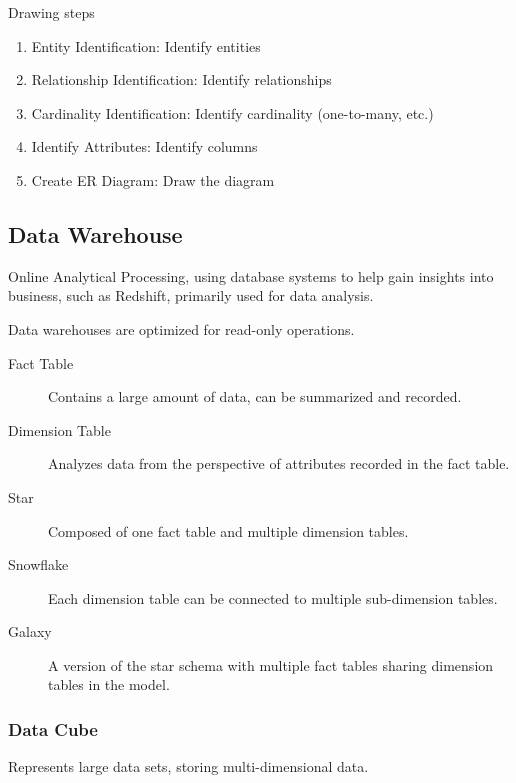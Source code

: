 \documentclass[11pt,journal,compsoc]{IEEEtran}
\begin{document}
Drawing steps

\begin{enumerate}
    \item Entity Identification: Identify entities
    \item Relationship Identification: Identify relationships
    \item Cardinality Identification: Identify cardinality (one-to-many, etc.)
    \item Identify Attributes: Identify columns
    \item Create ER Diagram: Draw the diagram
\end{enumerate}


\subsection{Data Warehouse}

Online Analytical Processing, using database systems to help gain insights into business, such as Redshift, primarily used for data analysis.

Data warehouses are optimized for read-only operations.

\begin{description}
    \item[Fact Table] Contains a large amount of data, can be summarized and recorded.
    
    \item[Dimension Table] Analyzes data from the perspective of attributes recorded in the fact table.
    
    \item[Star] Composed of one fact table and multiple dimension tables.
    
    \item[Snowflake] Each dimension table can be connected to multiple sub-dimension tables.
    
    \item[Galaxy] A version of the star schema with multiple fact tables sharing dimension tables in the model.
\end{description}

\subsubsection{Data Cube}

Represents large data sets, storing multi-dimensional data.
\end{document}
